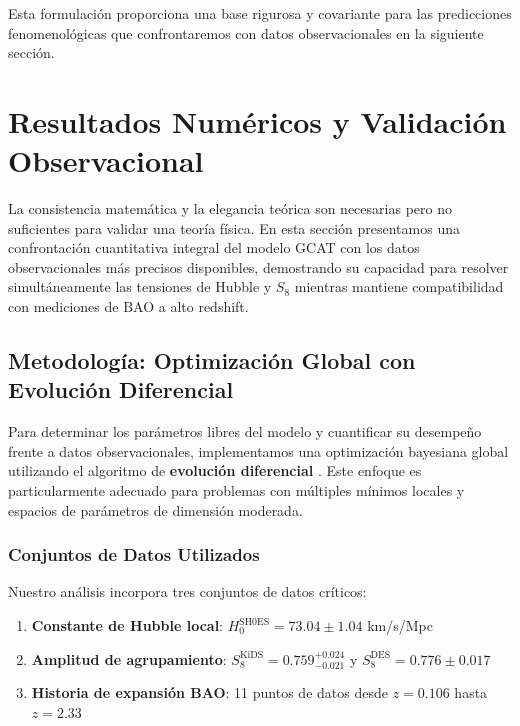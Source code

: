 \documentclass[12pt, a4paper]{article}
\theoremstyle{plain}
\theoremstyle{definition}
\begin{document}
Esta formulación proporciona una base rigurosa y covariante para las predicciones fenomenológicas que confrontaremos con datos observacionales en la siguiente sección.

\section{Resultados Numéricos y Validación Observacional}
\label{sec:resultados}

La consistencia matemática y la elegancia teórica son necesarias pero no suficientes para validar una teoría física. En esta sección presentamos una confrontación cuantitativa integral del modelo GCAT con los datos observacionales más precisos disponibles, demostrando su capacidad para resolver simultáneamente las tensiones de Hubble y $S_8$ mientras mantiene compatibilidad con mediciones de BAO a alto redshift.

\subsection{Metodología: Optimización Global con Evolución Diferencial}

Para determinar los parámetros libres del modelo y cuantificar su desempeño frente a datos observacionales, implementamos una optimización bayesiana global utilizando el algoritmo de \textbf{evolución diferencial} \cite{Storn1997}. Este enfoque es particularmente adecuado para problemas con múltiples mínimos locales y espacios de parámetros de dimensión moderada.

\subsubsection{Conjuntos de Datos Utilizados}

Nuestro análisis incorpora tres conjuntos de datos críticos:

\begin{enumerate}
    \item \textbf{Constante de Hubble local}: $H_0^{\text{SH0ES}} = 73.04 \pm 1.04$ km/s/Mpc \cite{Riess2022}
    \item \textbf{Amplitud de agrupamiento}: $S_8^{\text{KiDS}} = 0.759^{+0.024}_{-0.021}$ \cite{KiDS2021} y $S_8^{\text{DES}} = 0.776 \pm 0.017$ \cite{DES2022}
    \item \textbf{Historia de expansión BAO}: 11 puntos de datos desde $z = 0.106$ hasta $z = 2.33$ \cite{eBOSS2020, DESI2024}
\end{enumerate}
\end{document}
